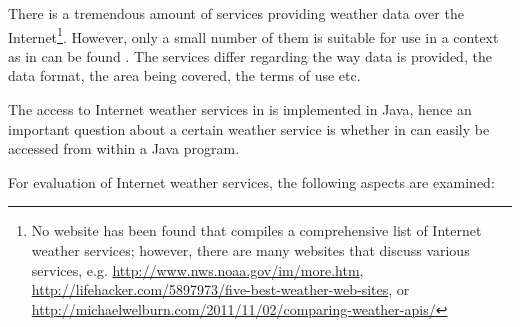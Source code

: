 There is a tremendous amount of services providing weather data over the Internet\footnote{No website has been found that compiles a comprehensive list of Internet weather services; however, there are many websites that discuss various services, e.g. \href{http://www.nws.noaa.gov/im/more.htm}{http://www.nws.noaa.gov/im/more.htm}, \href{http://lifehacker.com/5897973/five-best-weather-web-sites}{http://lifehacker.com/5897973/five-best-weather-web-sites}, or \href{http://michaelwelburn.com/2011/11/02/comparing-weather-apis/}{http://michaelwelburn.com/2011/11/02/comparing-weather-apis/}}. However, only a small number of them is suitable for use in a context as in can be found \thinkhome. The services differ regarding the way data is provided, the data format, the area being covered, the terms of use etc.

The access to Internet weather services in \thinkhome is implemented in Java, hence an important question about a certain weather service is whether in can easily be accessed from within a Java program.

For evaluation of Internet weather services, the following aspects are examined:

